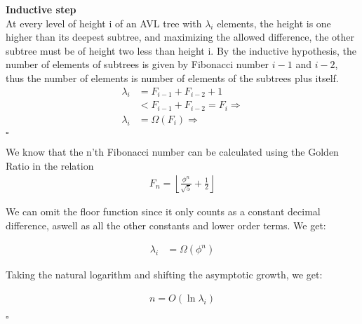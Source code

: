 \documentclass[11pt,english]{article}
\begin{document}
\noindent \textbf{Inductive step}\\[5pt]
At every level of height i of an AVL tree with $\lambda_i$ elements, the height 
is one higher than its deepest subtree, and maximizing the allowed difference,
the other subtree must be of height two less than height i. By the inductive 
hypothesis, the number of elements of subtrees is given by Fibonacci number $i-1$
and $i-2$, thus the number of elements is number of elements of the subtrees plus
itself.
\begin{align*}
\lambda_i &= F_{i-1} + F_{i-2} + 1 \\
          &< F_{i-1} + F_{i-2} = F_i \Rightarrow \\
          \lambda_i &= \Omega (F_i) \Rightarrow \\
\end{align*}
\hfill $\square$

We know that the n'th Fibonacci number can be calculated using the Golden Ratio
in the relation \\

\begin{align*}
F_n =  \left\lfloor \frac{\phi^n}{\sqrt{5}} + \frac{1}{2} \right\rfloor
\end{align*}

We can omit the floor function since it only counts as a constant decimal 
difference, aswell as all the other constants and lower order terms. We get:

\begin{align*}
\lambda_i &= \Omega \left( \phi^n \right)
\end{align*}

\noindent
Taking the natural logarithm and shifting the asymptotic growth, we get:

\begin{align*}
n = O(\ln \lambda_i)
\end{align*}

\hfill $\square$
\end{document}
